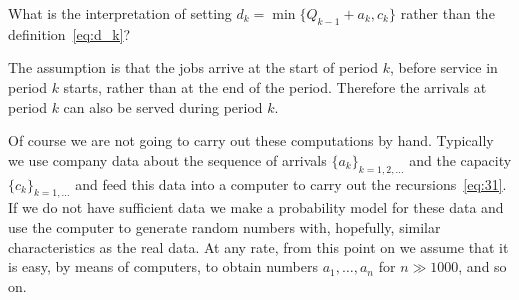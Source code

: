 \begin{exercise}
 What is the interpretation of setting
    $d_k = \min\{Q_{k-1}+a_k,  c_k\}$ rather than the definition~\eqref{eq:d_k}?
\begin{solution}
 The assumption is that the jobs arrive at the start of period
    $k$, before service in period $k$ starts, rather than at the end
    of the period. Therefore the arrivals at period $k$ can also be
    served during period $k$.
\end{solution}
\end{exercise}


Of course we are not going to carry out these computations by
hand. Typically we use company data about the sequence of arrivals
$\{a_k\}_{k=1,2,\ldots}$ and the capacity $\{c_k\}_{k=1,\ldots}$ and
feed this data into a computer to carry out the
recursions~\eqref{eq:31}. If we do not have sufficient data we make a
probability model for these data and use the computer to generate
random numbers with, hopefully, similar characteristics as the real
data. At any rate, from this point on we assume that it is easy, by
means of computers, to obtain numbers $a_1,\ldots, a_n$ for
$n\gg 1000$, and so on.


